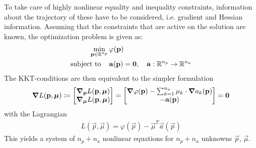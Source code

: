 		To take care of highly nonlinear equality and inequality constraints, information about the trajectory of these have to be considered, i.e. gradient and Hessian information. Assuming that the constraints that are active on the solution are known, the optimization problem is given as:
		\begin{align*}
			\min_{\boldsymbol{\mathrm{p}} \in \mathbb{R}^{n_p}} &\, \varphi(\boldsymbol{\mathrm{p}}) \\
			\mathrm{subject~to}\quad &\, \boldsymbol{\mathrm{a}}(\boldsymbol{\mathrm{p}}) = \boldsymbol{\mathrm{0}},\quad \boldsymbol{\mathrm{a}} : \mathbb{R}^{n_p} \to \mathbb{R}^{n_a}
		\end{align*}
		The KKT-conditions are then equivalent to the simpler formulation
		\begin{align*}
			\grad{L}(\boldsymbol{\mathrm{p}}, \boldsymbol{\mathrm{\mu}}) \coloneqq
				\begin{bmatrix}
					\grad_{\boldsymbol{\mathrm{p}}}L(\boldsymbol{\mathrm{p}}, \boldsymbol{\mathrm{\mu}}) \\
					\grad_{\boldsymbol{\mathrm{\mu}}}L(\boldsymbol{\mathrm{p}}, \boldsymbol{\mathrm{\mu}})
				\end{bmatrix}
			=
				\begin{bmatrix}
					\grad{\varphi}(\boldsymbol{\mathrm{p}}) - \sum_{k = 1}^{n_a} \mu_k \cdot \grad{a_k}(\boldsymbol{\mathrm{p}}) \\
					-\boldsymbol{\mathrm{a}}(\boldsymbol{\mathrm{p}})
				\end{bmatrix}
			= \boldsymbol{\mathrm{0}}
		\end{align*}
		with the Lagrangian
		\begin{align*}
			L(\vec{p}, \vec{\mu}) = \varphi(\vec{p}) - \vec{\mu}^T \vec{a}(\vec{p})
		\end{align*}
		This yields a system of \( n_p + n_a \) nonlinear equations for \( n_p + n_a \) unknowns \( \vec{p} \), \( \vec{\mu} \).
		
